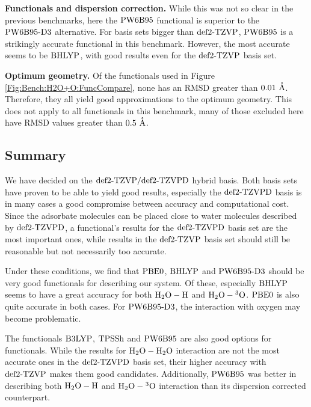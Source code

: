 \textbf{Functionals and dispersion correction.}
While this was not so clear in the previous benchmarks, here the $\text{PW6B95}$
functional is superior to the $\text{PW6B95}\text{-D3}$ alternative. For basis sets
bigger than $\text{def2-TZVP}$, $\text{PW6B95}$ is a strikingly accurate functional in this benchmark.
However, the most accurate seems to be $\text{BHLYP}$, with good results even for
the $\text{def2-TZVP}$ basis set.

\textbf{Optimum geometry.} Of the functionals used in Figure
\ref{Fig:Bench:H2O+O:FuncCompare}, none has an RMSD greater than $0.01\ \Ang$.
Therefore, they all yield good approximations to the optimum geometry. This
does not apply to all functionals in this benchmark, many of those excluded
here have RMSD values greater than $0.5\ \mathring{\text{A}}$. 

\subsection{Summary}

We have decided on the $\text{def2-TZVP}/\text{def2-TZVPD}$ hybrid basis. Both basis sets
have proven to be able to yield good results, especially the $\text{def2-TZVPD}$ basis
is in many cases a good compromise between accuracy and computational cost.
Since the adsorbate molecules can be placed close to water molecules described
by $\text{def2-TZVPD}$, a functional's results for the $\text{def2-TZVPD}$ basis set are the most
important ones, while results in the $\text{def2-TZVP}$ basis set should still be
reasonable but not necessarily too accurate.

Under these conditions, we find that $\text{PBE0}$, $\text{BHLYP}$ and $\text{PW6B95}\text{-D3}$ should be
very good functionals for describing our system. Of these, especially $\text{BHLYP}$
seems to have a great accuracy for both $\mbox{\ensuremath{\text H _2 \text O-\text H}}$ and $\mbox{\ensuremath{\text H _2 \text O-\hspace{.2pt} ^3\text{O}}}$. $\text{PBE0}$ is also
quite accurate in both cases. For $\text{PW6B95}\text{-D3}$, the interaction with oxygen
may become problematic. 

The functionals $\text{B3LYP}$, $\text{TPSSh}$ and $\text{PW6B95}$ are also good options for
functionals. While the results for $\mbox{\ensuremath{\text H _2 \text O-\text H _2 \text O}}$ interaction are not the most
accurate ones in the $\text{def2-TZVPD}$ basis set, their higher accuracy with $\text{def2-TZVP}$
makes them good candidates. Additionally, $\text{PW6B95}$ was better in describing both
$\mbox{\ensuremath{\text H _2 \text O-\text H}}$ and $\mbox{\ensuremath{\text H _2 \text O-\hspace{.2pt} ^3\text{O}}}$ interaction than its dispersion corrected counterpart.

